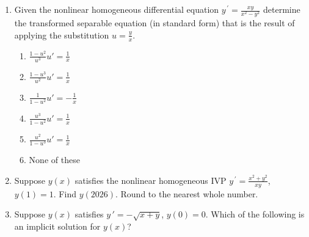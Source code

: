 \documentclass{ximera}
\begin{document}
\begin{enumerate}[label=(\arabic*)]
\begin{enumerate}[label=(\alph*)]
\item $\displaystyle y\,'=1+\frac{y}{x}$
\item $\displaystyle y\,'=1+\frac{x}{x+y}$ %
\item $\displaystyle y\,'=\frac{2x}{x^2+3y}$ 
\item $\displaystyle y\,'=\frac{2x^2}{x^2+y^2}$ %
\item $\displaystyle y\,'=e^{x/(x+y)}$  %
\item $\displaystyle y\,'=x+\frac{x}{y}+\frac{x^2}{y}$
\end{enumerate}



\item Given the nonlinear homogeneous differential equation $\displaystyle y^{\,\prime}=\frac{xy}{x^2-y^2}$ determine the transformed separable equation (in standard form) that is the result of applying the substitution $u=\frac{y}{x}$.

\begin{enumerate}[label=(\alph*)]
\item $\displaystyle \frac{1-u^2}{u^3} u'=\frac{1}{x}$ %
\item $\displaystyle \frac{1-u^3}{u^2} u'=\frac{1}{x}$
\item $\displaystyle \frac{1}{1-u^2} u'=-\frac{1}{x}$
\item $\displaystyle \frac{u^3}{1-u^2} u'=\frac{1}{x}$
\item $\displaystyle \frac{u^2}{1-u^3} u'=\frac{1}{x}$
\item None of these
\end{enumerate}






\item  Suppose $y(x)$ satisfies the nonlinear homogeneous IVP $\displaystyle y^{\,\prime}=\frac{x^2+y^2}{xy}$, $y(1)=1$.  Find $y(2026)$.  Round to the nearest whole number.


\newpage

\item Suppose $y(x)$ satisfies $y\,'=-\sqrt{x+y}$, $y(0)=0$.  Which of the following is an implicit solution for $y(x)$?


\end{enumerate}
\end{document}
